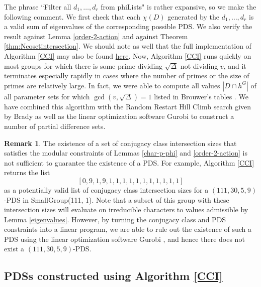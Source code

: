 \documentclass[12pt]{amsproc} %
\theoremstyle{definition}\newtheorem{defn}[thm]{Definition}
\theoremstyle{definition}\newtheorem{rem}[thm]{Remark}
\theoremstyle{definition}\newtheorem{ex}[thm]{Example}
\begin{document}
\FloatBarrier

The phrase ``Filter all $d_1, \dots, d_r$ from phiLists" is rather expansive, so we make the following comment. We first check that each $\chi(D)$ generated by the $d_1, \dots, d_r$ is a valid sum of eigenvalues of the corresponding possible PDS. We also verify the result against Lemma \ref{order-2-action} and against Theorem \ref{thm:Ncosetintersection}. We should note as well that the full implementation of Algorithm \ref{CCI} may also be found \href{https://github.com/srnelson1/PDS-class-intersections}{here}. Now, Algorithm \ref{CCI} runs quickly on most groups for which there is some prime dividing $\sqrt\Delta$ not dividing $v$, and it terminates especially rapidly in cases where the number of primes or the size of primes are relatively large. In fact, we were able to compute all values $|D\cap h^G|$ of all parameter sets for which $\gcd(v, \sqrt\Delta) = 1$ listed in Brouwer's tables \cite{brouwertables}. We have combined this algorithm with the Random Restart Hill Climb search given by Brady \cite{brady} as well as the linear optimization software Gurobi \cite{gurobi} to construct a number of partial difference sets.



\begin{rem}
 \label{rem:111}
 The existence of a set of conjugacy class intersection sizes that satisfies the modular constraints of Lemmas \ref{char-p-phi} and \ref{order-2-action} is not sufficient to guarantee the existence of a PDS. For example, Algorithm \ref{CCI} returns the list \[[ 0, 9, 1, 9, 1, 1, 1, 1, 1, 1, 1, 1, 1, 1, 1 ]\]
 as a potentially valid list of conjugacy class intersection sizes for a $(111,30,5,9)$-PDS in SmallGroup(111, 1). Note that a subset of this group with these intersection sizes will evaluate on irreducible characters to values admissible by Lemma \ref{eigenvalues}.  However, by turning the conjugacy class and PDS constraints into a linear program, we are able to rule out the existence of such a PDS using the linear optimization software Gurobi \cite{gurobi}, and hence there does not exist a $(111, 30 , 5, 9)$-PDS. 
 
\end{rem}


\subsection{PDSs constructed using Algorithm \ref{CCI}}
\end{document}
